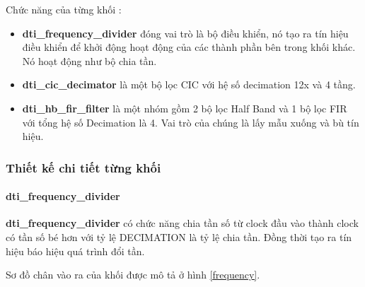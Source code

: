 Chức năng của từng khối :
\begin{itemize}
    \item \textbf{dti\_frequency\_divider} đóng vai trò là bộ điều khiển, nó tạo ra tín hiệu điều khiển để khởi động hoạt động của các thành phần bên trong khối khác. Nó hoạt động như bộ chia tần.
    \item \textbf{dti\_cic\_decimator} là một bộ lọc CIC với hệ số decimation 12x và 4 tầng.
    \item \textbf{dti\_hb\_fir\_filter} là một nhóm gồm 2 bộ lọc Half Band và 1 bộ lọc FIR với tổng hệ số Decimation là 4. Vai trò của chúng là lấy mẫu xuống và bù tín hiệu.
\end{itemize}

\subsubsection{Thiết kế chi tiết từng khối}
\paragraph{dti\_frequency\_divider}
\textbf{dti\_frequency\_divider} có chức năng chia tần số từ clock đầu vào thành clock có tần số bé hơn với tỷ lệ DECIMATION là tỷ lệ chia tần. Đồng thời tạo ra tín hiệu báo hiệu quá trình đổi tần.

Sơ đồ chân vào ra của khối được mô tả ở hình \ref{frequency}.

